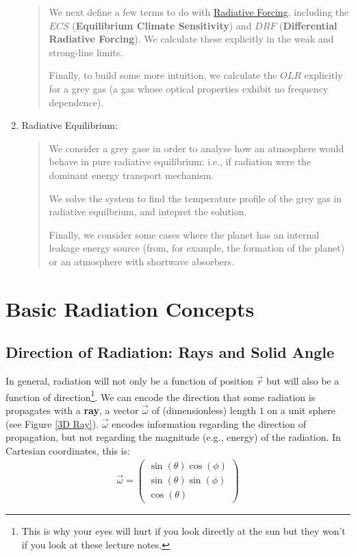 \begin{enumerate}
\begin{quote}
            We next define a few terms to do with \hyperref[RF Box]{Radiative Forcing}, including the $ECS$ (\textbf{Equilibrium Climate Sensitivity}) and $DRF$ (\textbf{Differential Radiative Forcing}). We calculate these explicitly in the weak and strong-line limits.

            Finally, to build some more intuition, we calculate the $OLR$ explicitly for a grey gas (a gas whose optical properties exhibit no frequency dependence).
        \end{quote}
    \item Radiative Equilibrium:
        
        \begin{quote}
            We consider a grey gase in order to analyse how an atmosphere would behave in pure radiative equilibrium: i.e., if radiation were the dominant energy transport mechanism.

            We solve the system to find the temperature profile of the grey gas in radiative equilbrium, and intepret the solution.

            Finally, we consider some cases where the planet has an internal leakage energy source (from, for example, the formation of the planet) or an atmosphere with shortwave absorbers.
        \end{quote}
\end{enumerate}

\chapter{Basic Radiation Concepts}

\section{Direction of Radiation: Rays and Solid Angle}

In general, radiation will not only be a function of position $\vec{r}$ but will also be a function of direction\footnote{This is why your eyes will hurt if you look directly at the sun but they won't if you look at these lecture notes.}. We can encode the direction that some radiation is propagates with a \textbf{ray}, a vector $\vec{\omega}$ of (dimensionless) length $1$ on a unit sphere (see Figure \ref{3D Ray}). $\vec{\omega}$ encodes information regarding the direction of propagation, but not regarding the magnitude (e.g., energy) of the radiation. In Cartesian coordinates, this is:
\begin{align}
    \vec{\omega}=\left(\begin{array}{ccc}
         \sin(\theta)\cos(\phi)\\
         \sin(\theta)\sin(\phi)\\
         \cos(\theta)
    \end{array}\right)
\end{align}

